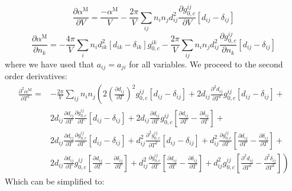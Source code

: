 \documentclass[english]{../thermomemo/thermomemo}
\begin{document}
\begin{equation}
\frac{\partial \alpha^{\text{M}}}{\partial V}=\frac{-\alpha^{\text{M}}}{V}-\frac{2\pi}{V}\sum_{ij}n_in_jd_{ij}^2\frac{\partial g_{0,c}^{ij}}{\partial V}\left[d_{ij}-\delta_{ij}\right]
\end{equation}
\begin{equation}
\frac{\partial \alpha^{\text{M}}}{\partial n_k}=-\frac{4\pi}{V}\sum_{i}n_id_{ik}^2\left[d_{ik}-\delta_{ik}\right]g_{0,c}^{ik}-\frac{2\pi}{V}\sum_{ij}n_in_jd_{ij}^2\frac{\partial g_{0,c}^{ij}}{\partial n_k}\left[d_{ij}-\delta_{ij}\right]
\end{equation}
where we have used that $a_{ij}=a_{ji}$ for all variables. We proceed to the second order derivatives:
\begin{equation}
\begin{split}
\frac{\partial^2 \alpha^{\text{M}}}{\partial T^2}=&-\frac{2\pi}{V}\sum_{ij}n_in_j\left(2\left(\frac{\partial d_{ij}}{\partial T}\right)^2g_{0,c}^{ij}\left[d_{ij}-\delta_{ij}\right]\right.+
2d_{ij}\frac{\partial^2 d_{ij}}{\partial T^2}g_{0,c}^{ij}\left[d_{ij}-\delta_{ij}\right]+\\
&2d_{ij}\frac{\partial d_{ij}}{\partial T}\frac{\partial g_{0,c}^{ij}}{\partial T}\left[d_{ij}-\delta_{ij}\right]+
2d_{ij}\frac{\partial d_{ij}}{\partial T}g_{0,c}^{ij}\left[\frac{\partial d_{ij}}{\partial T}-\frac{\partial \delta_{ij}}{\partial T}\right]+ \\
&2d_{ij}\frac{\partial d_{ij}}{\partial T}\frac{\partial g_{0,c}^{ij}}{\partial T}\left[d_{ij}-\delta_{ij}\right]+ d_{ij}^2\frac{\partial^2 g_{0,c}^{ij}}{\partial T^2}\left[d_{ij}-\delta_{ij}\right]+ d_{ij}^2\frac{\partial g_{0,c}^{ij}}{\partial T}\left[\frac{\partial d_{ij}}{\partial T}-\frac{\partial \delta_{ij}}{\partial T}\right]+ \\
&\left. 2d_{ij}\frac{\partial d_{ij}}{\partial T}g_{0,c}^{ij}\left[\frac{\partial d_{ij}}{\partial T}-\frac{\partial \delta_{ij}}{\partial T}\right]+
d_{ij}^2\frac{\partial g_{0,c}^{ij}}{\partial T}\left[\frac{\partial d_{ij}}{\partial T}-\frac{\partial \delta_{ij}}{\partial T}\right]+
d_{ij}^2g_{0,c}^{ij}\left[\frac{\partial^2 d_{ij}}{\partial T^2}-\frac{\partial^2 \delta_{ij}}{\partial T^2}\right]\right)
\end{split}
\end{equation}
Which can be simplified to:
\end{document}
